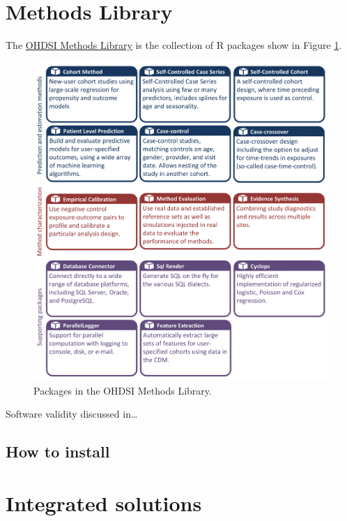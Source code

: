 \documentclass[11pt]{book}
\begin{document}
\section{Methods Library}\label{methods-library}

The \href{https://ohdsi.github.io/MethodsLibrary/}{OHDSI Methods
Library} is the collection of R packages show in Figure
\ref{fig:methodsLibrary}.

\begin{figure}

{\centering \includegraphics[width=1\linewidth]{images/OhdsiAnalyticsTools/methodsLibrary} 

}

\caption{Packages in the OHDSI Methods Library.}\label{fig:methodsLibrary}
\end{figure}

Software validity discussed in\ldots{}

\subsection{How to install}\label{how-to-install-1}

\section{Integrated solutions}\label{integrated-solutions}
\end{document}
